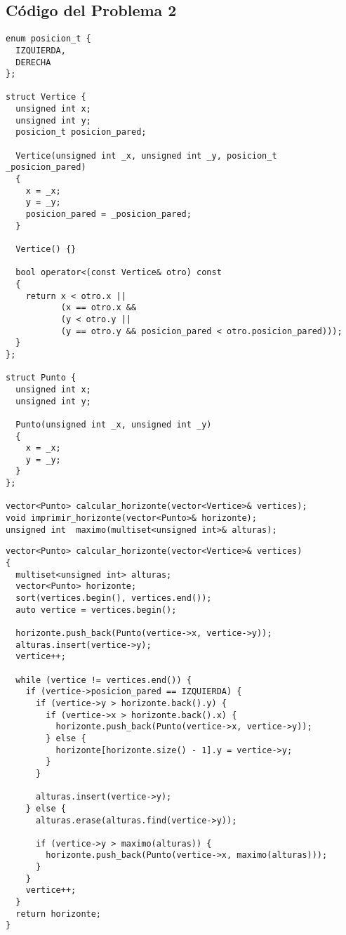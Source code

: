 \documentclass[a4paper]{article}
\begin{document}
\subsection{Código del Problema 2}



\begin{lstlisting}
enum posicion_t {
  IZQUIERDA,
  DERECHA
};

struct Vertice {
  unsigned int x;
  unsigned int y;
  posicion_t posicion_pared;

  Vertice(unsigned int _x, unsigned int _y, posicion_t _posicion_pared)
  {
    x = _x;
    y = _y;
    posicion_pared = _posicion_pared;
  }

  Vertice() {}

  bool operator<(const Vertice& otro) const
  {
    return x < otro.x ||
           (x == otro.x &&
           (y < otro.y ||
           (y == otro.y && posicion_pared < otro.posicion_pared)));
  }
};

struct Punto {
  unsigned int x;
  unsigned int y;

  Punto(unsigned int _x, unsigned int _y)
  {
    x = _x;
    y = _y;
  }
};

vector<Punto> calcular_horizonte(vector<Vertice>& vertices);
void imprimir_horizonte(vector<Punto>& horizonte);
unsigned int  maximo(multiset<unsigned int>& alturas);
\end{lstlisting} 

\newpage	

\begin{lstlisting}
vector<Punto> calcular_horizonte(vector<Vertice>& vertices)
{
  multiset<unsigned int> alturas;
  vector<Punto> horizonte;
  sort(vertices.begin(), vertices.end());
  auto vertice = vertices.begin();

  horizonte.push_back(Punto(vertice->x, vertice->y));
  alturas.insert(vertice->y);
  vertice++;

  while (vertice != vertices.end()) {
    if (vertice->posicion_pared == IZQUIERDA) {
      if (vertice->y > horizonte.back().y) {
        if (vertice->x > horizonte.back().x) {
          horizonte.push_back(Punto(vertice->x, vertice->y));
        } else {
          horizonte[horizonte.size() - 1].y = vertice->y;
        }
      }

      alturas.insert(vertice->y);
    } else {
      alturas.erase(alturas.find(vertice->y));
      
      if (vertice->y > maximo(alturas)) {
        horizonte.push_back(Punto(vertice->x, maximo(alturas)));
      }
    }
    vertice++;
  }
  return horizonte;
}
\end{lstlisting}
\end{document}
